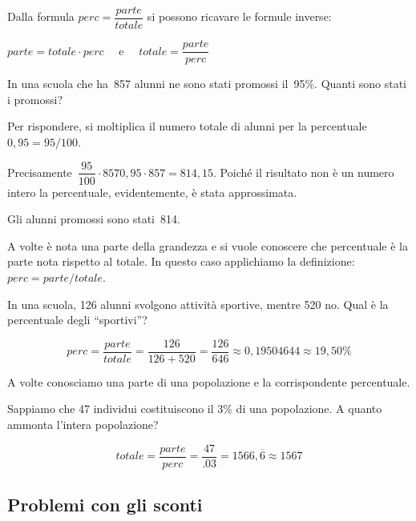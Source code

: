 Dalla formula \quad \(perc = \dfrac{parte}{totale}\) \quad 
si possono ricavare le formule inverse: 

\hspace*{25mm}
\(parte = totale \cdot perc \quad \text{ e } \quad 
  totale = \dfrac{parte}{perc}\)


\begin{esempio}{}{}
In una scuola che ha~857 alunni ne sono stati promossi il~95\%. 
Quanti sono stati i promossi?

Per rispondere, si moltiplica il numero totale di alunni per la 
percentuale~\(0,95 = 95/100\).

Precisamente~\(\dfrac{95}{100} \cdot 857 0,95 \cdot 857 = 814,15\).
Poiché il risultato non è un numero intero la percentuale, evidentemente, 
è stata approssimata. 

Gli alunni promossi sono stati~814.
 \end{esempio}

A volte è nota una parte della grandezza e si vuole conoscere che 
percentuale è la parte nota rispetto al totale. 
In questo caso applichiamo la definizione: \(perc = parte/totale\).

\begin{esempio}{}{}
In una scuola, 126 alunni svolgono attività sportive, mentre 520 no.
Qual è la percentuale degli ``sportivi''?

\vspace{-.5em}
\[perc = \frac{parte}{totale} =
\frac{126}{126+520} = \frac{126}{646} \approx 0,19504644 \approx 19,50\%\]
\end{esempio}

A volte conosciamo una parte di una popolazione e la corrispondente 
percentuale.

\begin{esempio}{}{}
Sappiamo che 47 individui costituiscono il 3\% di una popolazione. 
A quanto ammonta l'intera popolazione?

\vspace{-.5em}
\[totale = \frac{parte}{perc} = \frac{47}{.03} = 1566,\overline 6 
\approx 1567\]
\end{esempio}

 \pagebreak %

\subsection{Problemi con gli sconti}

